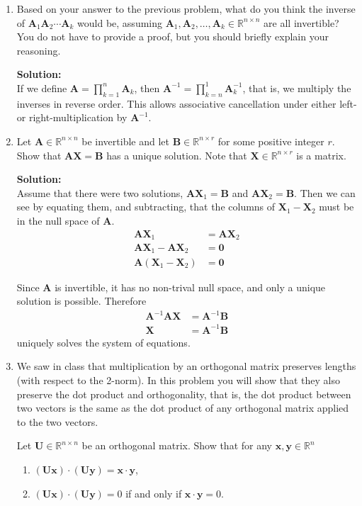 \documentclass[]{article}
\newcommand{\R}{\mathbb{R}}				%
\newcommand{\x}{\bm{x}}					%
\newcommand{\y}{\bm{y}}					%
\newcommand{\A}{\bm{A}}					%
\newcommand{\solution}{\vskip 0.5cm \textbf{\large Solution:} \\}
\begin{document}
\begin{enumerate}
	\item Based on your answer to the previous problem, what do you think the inverse of $\A_1\A_2\cdots \A_k$ would be, assuming $\A_1,\A_2,\dots,\A_k\in\R^{n\times n}$ are all invertible? You do not have to provide a proof, but you should briefly explain your reasoning.

	  \solution

      If we define $\A = \prod_{k=1}^{n} \A_k$, then $\A^{-1} =
      \prod_{k=n}^{1} \A_k^{-1}$, that is, we multiply the inverses in
      reverse order. This allows associative cancellation under either
      left- or right-multiplication by $\A^{-1}$.


	\item Let $\A\in\R^{n\times n}$ be invertible and let $\bm{B}\in\R^{n\times r}$ for some positive integer $r$. Show that $\bm{AX}=\bm{B}$ has a unique solution. Note that $\bm{X}\in\R^{n\times r}$ is a matrix.

	  \solution Assume that there were two solutions, $\A\bm{X}_1 =
      \bm{B}$ and $\A\bm{X}_2 = \bm{B}$. Then we can see by equating
      them, and subtracting, that the columns of $\bm{X}_1 - \bm{X}_2$
      must be in the null space of $\A$.
      \[
      \begin{split}
        \A\bm{X}_1 & = \A\bm{X}_2 \\
        \A\bm{X}_1 - \A\bm{X}_2 &= \bm{0}\\
        \A(\bm{X}_1 - \bm{X}_2) &= \bm{0}
      \end{split}
      \]
      
      Since $\A$ is invertible, it
      has no non-trival null space, and only a unique solution is
      possible. Therefore
      \[
      \begin{split}
        \A^{-1}\A\bm{X} &= \A^{-1}\bm{B} \\
        \bm{X} &= \A^{-1}\bm{B}
      \end{split}
      \]
      uniquely solves the system of equations.


	\item We saw in class that multiplication by an orthogonal matrix
      preserves lengths (with respect to the 2-norm). In this problem
      you will show that they also preserve the dot product and
      orthogonality, that is, the dot product between two vectors is
      the same as the dot product of any orthogonal matrix applied to
      the two vectors.

	  Let $\bm{U}\in\R^{n\times n}$ be an orthogonal matrix. Show that for any $\x,\y\in\R^n$
	  \begin{enumerate}
	  \item $(\bm{Ux})\cdot(\bm{Uy})=\x\cdot\y$,
	  \item $(\bm{Ux})\cdot(\bm{Uy}) = 0$ if and only if $\x\cdot \y=0$.


\end{enumerate}
\end{enumerate}
\end{document}
